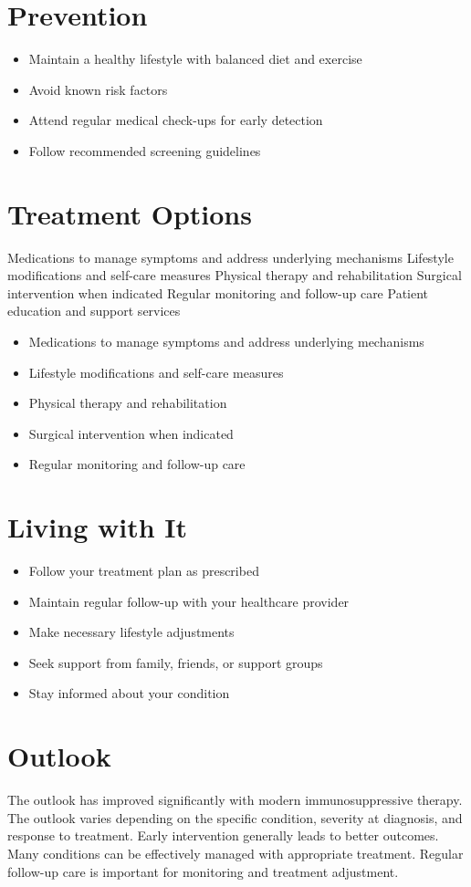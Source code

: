 \section{Prevention}
\begin{itemize}[noitemsep]
  \item Maintain a healthy lifestyle with balanced diet and exercise
  \item Avoid known risk factors
  \item Attend regular medical check-ups for early detection
  \item Follow recommended screening guidelines
\end{itemize}
\section{Treatment Options}
Medications to manage symptoms and address underlying mechanisms Lifestyle modifications and self-care measures Physical therapy and rehabilitation Surgical intervention when indicated Regular monitoring and follow-up care Patient education and support services

\begin{itemize}[noitemsep]
  \item Medications to manage symptoms and address underlying mechanisms
  \item Lifestyle modifications and self-care measures
  \item Physical therapy and rehabilitation
  \item Surgical intervention when indicated
  \item Regular monitoring and follow-up care
\end{itemize}
\section{Living with It}
\begin{itemize}[noitemsep]
  \item Follow your treatment plan as prescribed
  \item Maintain regular follow-up with your healthcare provider
  \item Make necessary lifestyle adjustments
  \item Seek support from family, friends, or support groups
  \item Stay informed about your condition
\end{itemize}
\section{Outlook}
The outlook has improved significantly with modern immunosuppressive therapy. The outlook varies depending on the specific condition, severity at diagnosis, and response to treatment. Early intervention generally leads to better outcomes. Many conditions can be effectively managed with appropriate treatment. Regular follow-up care is important for monitoring and treatment adjustment.
